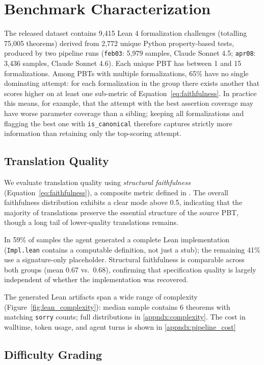 \section{Benchmark Characterization}

The released dataset contains 9,415 Lean 4 formalization challenges (totalling 75,005 theorems) derived from 2,772 unique Python property-based tests, produced by two pipeline runs (\texttt{feb03}: 5,979 samples, Claude Sonnet 4.5; \texttt{apr08}: 3,436 samples, Claude Sonnet 4.6). Each unique PBT has between 1 and 15 formalizations. Among PBTs with multiple formalizations, 65\% have no single dominating attempt: for each formalization in the group there exists another that scores higher on at least one sub-metric of Equation~\ref{eq:faithfulness}. In practice this means, for example, that the attempt with the best assertion coverage may have worse parameter coverage than a sibling; keeping all formalizations and flagging the best one with \texttt{is\_canonical} therefore captures strictly more information than retaining only the top-scoring attempt.

\subsection{Translation Quality}

We evaluate translation quality using \emph{structural faithfulness} (Equation~\ref{eq:faithfulness}), a composite metric defined in . The overall faithfulness distribution exhibits a clear mode above 0.5, indicating that the majority of translations preserve the essential structure of the source PBT, though a long tail of lower-quality translations remains.

In 59\% of samples the agent generated a complete Lean implementation (\texttt{Impl.lean} contains a computable definition, not just a stub); the remaining 41\% use a signature-only placeholder. Structural faithfulness is comparable across both groups (mean 0.67 vs.\ 0.68), confirming that specification quality is largely independent of whether the implementation was recovered.

The generated Lean artifacts span a wide range of complexity (Figure~\ref{fig:lean_complexity}): median sample contains 6 theorems with matching \texttt{sorry} counts; full distributions in \ref{appndx:complexity}. The cost in walltime, token usage, and agent turns is shown in \ref{appndx:pipeline_cost}

\subsection{Difficulty Grading}

